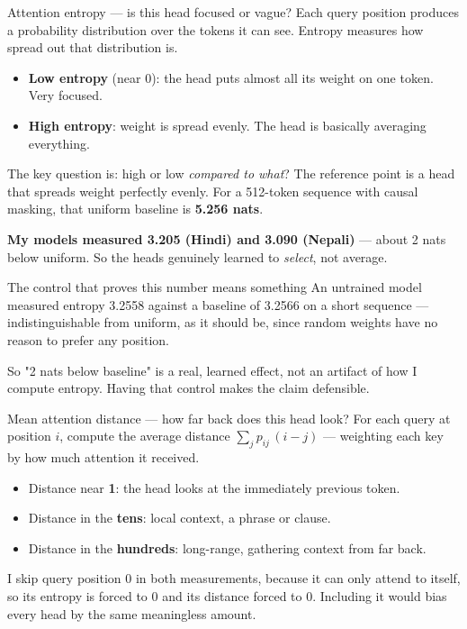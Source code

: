 \documentclass[11pt]{report}
\begin{document}
\begin{concept}{Attention entropy --- is this head focused or vague?}
Each query position produces a probability distribution over the tokens it can
see. Entropy measures how spread out that distribution is.

\begin{itemize}[leftmargin=*]
\item \textbf{Low entropy} (near 0): the head puts almost all its weight on one
      token. Very focused.
\item \textbf{High entropy}: weight is spread evenly. The head is basically
      averaging everything.
\end{itemize}

The key question is: high or low \emph{compared to what}? The reference point is
a head that spreads weight perfectly evenly. For a 512-token sequence with causal
masking, that uniform baseline is \textbf{5.256 nats}.

\textbf{My models measured 3.205 (Hindi) and 3.090 (Nepali)} --- about 2 nats
below uniform. So the heads genuinely learned to \emph{select}, not average.
\end{concept}

\begin{example}{The control that proves this number means something}
An untrained model measured entropy 3.2558 against a baseline of 3.2566 on a
short sequence --- indistinguishable from uniform, as it should be, since random
weights have no reason to prefer any position.

So "2 nats below baseline" is a real, learned effect, not an artifact of how I
compute entropy. Having that control makes the claim defensible.
\end{example}

\begin{concept}{Mean attention distance --- how far back does this head look?}
For each query at position $i$, compute the average distance
$\sum_j p_{ij}\,(i-j)$ --- weighting each key by how much attention it received.

\begin{itemize}[leftmargin=*]
\item Distance near \textbf{1}: the head looks at the immediately previous token.
\item Distance in the \textbf{tens}: local context, a phrase or clause.
\item Distance in the \textbf{hundreds}: long-range, gathering context from far
      back.
\end{itemize}

I skip query position 0 in both measurements, because it can only attend to
itself, so its entropy is forced to 0 and its distance forced to 0. Including it
would bias every head by the same meaningless amount.
\end{concept}
\end{document}
